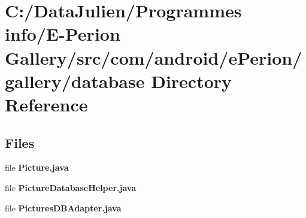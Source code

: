\section{C\-:/\-Data\-Julien/\-Programmes info/\-E-\/\-Perion Gallery/src/com/android/e\-Perion/gallery/database Directory Reference}
\label{dir_3971972c89e97312a874759ca2c48fa0}
\subsection*{Files}
\begin{DoxyCompactItemize}
\item 
file {\bfseries Picture.\-java}
\item 
file {\bfseries Picture\-Database\-Helper.\-java}
\item 
file {\bfseries Pictures\-D\-B\-Adapter.\-java}
\end{DoxyCompactItemize}
